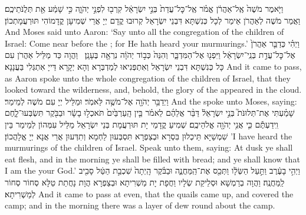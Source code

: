 {וַיֹּ֤אמֶר מֹשֶׁה֙ אֶֽל־אַהֲרֹ֔ן אֱמֹ֗ר אֶֽל־כׇּל־עֲדַת֙ בְּנֵ֣י יִשְׂרָאֵ֔ל קִרְב֖וּ לִפְנֵ֣י יְהֹוָ֑ה כִּ֣י שָׁמַ֔ע אֵ֖ת תְּלֻנֹּתֵיכֶֽם׃
}
{וַאֲמַר מֹשֶׁה לְאַהֲרֹן אֵימַר לְכָל כְּנִשְׁתָּא דִּבְנֵי יִשְׂרָאֵל קְרוּבוּ קֳדָם יְיָ אֲרֵי שְׁמִיעָן קֳדָמוֹהִי תּוּרְעֲמָתְכוֹן׃}
{And Moses said unto Aaron: ‘Say unto all the congregation of the children of Israel: Come near before the \lord; for He hath heard your murmurings.’}{}
{וַיְהִ֗י כְּדַבֵּ֤ר אַהֲרֹן֙ אֶל־כׇּל־עֲדַ֣ת בְּנֵֽי־יִשְׂרָאֵ֔ל וַיִּפְנ֖וּ אֶל־הַמִּדְבָּ֑ר וְהִנֵּה֙ כְּב֣וֹד יְהֹוָ֔ה נִרְאָ֖ה בֶּעָנָֽן׃ \petucha }
{וַהֲוָה כַּד מַלֵּיל אַהֲרֹן עִם כָּל כְּנִשְׁתָּא דִּבְנֵי יִשְׂרָאֵל וְאִתְפְּנִיאוּ לְמַדְבְּרָא וְהָא יְקָרָא דַּייָ אִתְגְּלִי בַּעֲנָנָא׃}
{And it came to pass, as Aaron spoke unto the whole congregation of the children of Israel, that they looked toward the wilderness, and, behold, the glory of the \lord\space appeared in the cloud.}{}
{וַיְדַבֵּ֥ר יְהֹוָ֖ה אֶל־מֹשֶׁ֥ה לֵּאמֹֽר׃}
{וּמַלֵּיל יְיָ עִם מֹשֶׁה לְמֵימַר׃}
{And the \lord\space spoke unto Moses, saying:}{}
{שָׁמַ֗עְתִּי אֶת־תְּלוּנֹּת֮ בְּנֵ֣י יִשְׂרָאֵל֒ דַּבֵּ֨ר אֲלֵהֶ֜ם לֵאמֹ֗ר בֵּ֤ין הָֽעַרְבַּ֙יִם֙ תֹּאכְל֣וּ בָשָׂ֔ר וּבַבֹּ֖קֶר תִּשְׂבְּעוּ־לָ֑חֶם וִֽידַעְתֶּ֕ם כִּ֛י אֲנִ֥י יְהֹוָ֖ה אֱלֹהֵיכֶֽם׃}
{שְׁמִיעַ קֳדָמַי יָת תּוּרְעֲמָת בְּנֵי יִשְׂרָאֵל מַלֵּיל עִמְּהוֹן לְמֵימַר בֵּין שִׁמְשַׁיָּא תֵּיכְלוּן בִּסְרָא וּבְצַפְרָא תִּסְבְּעוּן לַחְמָא וְתִדְּעוּן אֲרֵי אֲנָא יְיָ אֱלָהֲכוֹן׃}
{’I have heard the murmurings of the children of Israel. Speak unto them, saying: At dusk ye shall eat flesh, and in the morning ye shall be filled with bread; and ye shall know that I am the \lord\space your God.’}{}
{וַיְהִ֣י בָעֶ֔רֶב וַתַּ֣עַל הַשְּׂלָ֔ו וַתְּכַ֖ס אֶת־הַֽמַּחֲנֶ֑ה וּבַבֹּ֗קֶר הָֽיְתָה֙ שִׁכְבַ֣ת הַטַּ֔ל סָבִ֖יב לַֽמַּחֲנֶֽה׃
}
{וַהֲוָה בְרַמְשָׁא וּסְלֵיקַת שְׂלָיו וַחֲפָת יָת מַשְׁרִיתָא וּבְצַפְרָא הֲוָת נָחֲתַת טַלָּא סְחוֹר סְחוֹר לְמַשְׁרִיתָא׃}
{And it came to pass at even, that the quails came up, and covered the camp; and in the morning there was a layer of dew round about the camp.}{}
